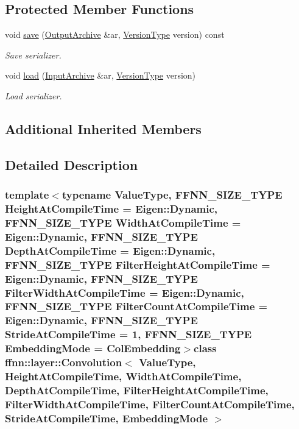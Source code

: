 \subsection*{Protected Member Functions}
\begin{DoxyCompactItemize}
\item 
void \hyperlink{classffnn_1_1layer_1_1_convolution_a1876a9eae2a7d48eab12279300e5adf9}{save} (\hyperlink{classffnn_1_1traits_1_1_serializable_a08d986df75d363fa79506d4f6045cb9f}{Output\-Archive} \&ar, \hyperlink{classffnn_1_1traits_1_1_serializable_a08924b3b7d20cb3cb6eafe517d4f7b30}{Version\-Type} version) const 
\begin{DoxyCompactList}\small\item\em Save serializer. \end{DoxyCompactList}\item 
void \hyperlink{classffnn_1_1layer_1_1_convolution_a8e6ebb03724af8588b77c60aafd7da2a}{load} (\hyperlink{classffnn_1_1traits_1_1_serializable_a6e626759259f8f370dd4303b4441a234}{Input\-Archive} \&ar, \hyperlink{classffnn_1_1traits_1_1_serializable_a08924b3b7d20cb3cb6eafe517d4f7b30}{Version\-Type} version)
\begin{DoxyCompactList}\small\item\em Load serializer. \end{DoxyCompactList}\end{DoxyCompactItemize}
\subsection*{Additional Inherited Members}


\subsection{Detailed Description}
\subsubsection*{template$<$typename Value\-Type, F\-F\-N\-N\-\_\-\-S\-I\-Z\-E\-\_\-\-T\-Y\-P\-E Height\-At\-Compile\-Time = Eigen\-::\-Dynamic, F\-F\-N\-N\-\_\-\-S\-I\-Z\-E\-\_\-\-T\-Y\-P\-E Width\-At\-Compile\-Time = Eigen\-::\-Dynamic, F\-F\-N\-N\-\_\-\-S\-I\-Z\-E\-\_\-\-T\-Y\-P\-E Depth\-At\-Compile\-Time = Eigen\-::\-Dynamic, F\-F\-N\-N\-\_\-\-S\-I\-Z\-E\-\_\-\-T\-Y\-P\-E Filter\-Height\-At\-Compile\-Time = Eigen\-::\-Dynamic, F\-F\-N\-N\-\_\-\-S\-I\-Z\-E\-\_\-\-T\-Y\-P\-E Filter\-Width\-At\-Compile\-Time = Eigen\-::\-Dynamic, F\-F\-N\-N\-\_\-\-S\-I\-Z\-E\-\_\-\-T\-Y\-P\-E Filter\-Count\-At\-Compile\-Time = Eigen\-::\-Dynamic, F\-F\-N\-N\-\_\-\-S\-I\-Z\-E\-\_\-\-T\-Y\-P\-E Stride\-At\-Compile\-Time = 1, F\-F\-N\-N\-\_\-\-S\-I\-Z\-E\-\_\-\-T\-Y\-P\-E Embedding\-Mode = Col\-Embedding$>$class ffnn\-::layer\-::\-Convolution$<$ Value\-Type, Height\-At\-Compile\-Time, Width\-At\-Compile\-Time, Depth\-At\-Compile\-Time, Filter\-Height\-At\-Compile\-Time, Filter\-Width\-At\-Compile\-Time, Filter\-Count\-At\-Compile\-Time, Stride\-At\-Compile\-Time, Embedding\-Mode $>$}

